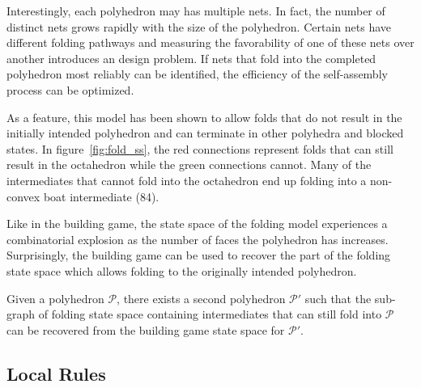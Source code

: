 Interestingly, each polyhedron may has multiple nets. In fact, the number of distinct nets grows rapidly with the size of the polyhedron. Certain nets have different folding pathways and measuring the favorability of one of these nets over another introduces an design problem. If nets that fold into the completed polyhedron most reliably can be identified, the efficiency of the self-assembly process can be optimized.

\begin{figure}[h]
%
%
%
\label{fig:fold_octa}
\end{figure}

As a feature, this model has been shown to allow folds that do not result in the initially intended polyhedron and can terminate in other polyhedra and blocked states. In figure~\ref{fig:fold_ss}, the red connections represent folds that can still result in the octahedron while the green connections cannot. Many of the intermediates that cannot fold into the octahedron end up folding into a non-convex boat intermediate (84).

Like in the building game, the state space of the folding model experiences a combinatorial explosion as the number of faces the polyhedron has increases. Surprisingly, the building game can be used to recover the part of the folding state space which allows folding to the originally intended polyhedron. 
\begin{mythm}
Given a polyhedron $\mathcal{P}$, there exists a second polyhedron $\mathcal{P}'$ such that the sub-graph of folding state space containing intermediates that can still fold into $\mathcal{P}$ can be recovered from the building game state space for $\mathcal{P}'$.  
\end{mythm}


\subsection{Local Rules}

